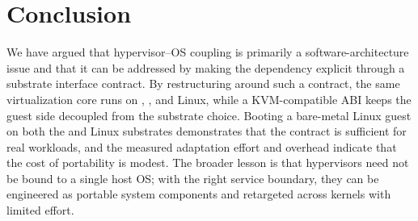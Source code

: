 \section{Conclusion}

We have argued that hypervisor--OS coupling is primarily a software-architecture
issue and that it can be addressed by making the dependency explicit through a
substrate interface contract. By restructuring \axvisor{} around such a
contract, the same virtualization core runs on \arceos{}, \asterinas{}, and
Linux, while a KVM-compatible ABI keeps the guest side decoupled from the
substrate choice. Booting a bare-metal Linux guest on both the \asterinas{} and
Linux substrates demonstrates that the contract is sufficient for real
workloads, and the measured adaptation effort and overhead indicate that the
cost of portability is modest. The broader lesson is that hypervisors need not
be bound to a single host OS; with the right service boundary, they can be
engineered as portable system components and retargeted across kernels with
limited effort.
